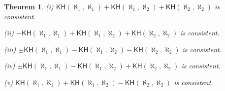 \documentclass[10pt,reqno]{amsart}
\theoremstyle{plain}
\newtheorem{theorem}{Theorem}[section]
\theoremstyle{definition}
\theoremstyle{remark}
\begin{document}
\begin{theorem}\label{KH_comb}
(i) $\mathsf{KH}(\aleph_1,\aleph_1)+\mathsf{KH}(\aleph_1,\aleph_2)+\mathsf{KH}(\aleph_2,\aleph_2)$ is consistent.

(ii) $-\mathsf{KH}(\aleph_1,\aleph_1)+\mathsf{KH}(\aleph_1,\aleph_2)+\mathsf{KH}(\aleph_2,\aleph_2)$ is consistent.

(iii) $\pm\mathsf{KH}(\aleph_1,\aleph_1)-\mathsf{KH}(\aleph_1,\aleph_2)-\mathsf{KH}(\aleph_2,\aleph_2)$ is consistent.

(iv) $\pm\mathsf{KH}(\aleph_1,\aleph_1)-\mathsf{KH}(\aleph_1,\aleph_2)+\mathsf{KH}(\aleph_2,\aleph_2)$ is consistent.

(v) $\mathsf{KH}(\aleph_1,\aleph_1)+\mathsf{KH}(\aleph_1,\aleph_2)-\mathsf{KH}(\aleph_2,\aleph_2)$ is consistent.
\end{theorem}
\end{document}
